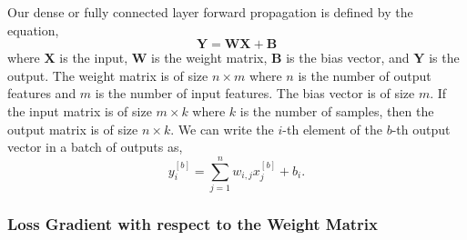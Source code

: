 \documentclass[twocolumn,pra,floatfix]{revtex4-2}
\begin{document}
                Our dense or fully connected layer forward propagation is defined by the equation,
                \begin{equation}
                    \mathbf{Y} = \mathbf{W} \mathbf{X} + \mathbf{B}\label{eq:5}
                \end{equation}
                where $\mathbf{X}$ is the input, $\mathbf{W}$ is the weight matrix, $\mathbf{B}$ is the bias vector, and $\mathbf{Y}$ is the output. The weight matrix is of size $n \times m$ where $n$ is the number of output features and $m$ is the number of input features. The bias vector is of size $m$. If the input matrix is of size $m \times k$ where $k$ is the number of samples, then the output matrix is of size $n \times k$. We can write the $i$-th element of the $b$-th output vector in a batch of outputs as,
                \begin{equation}
                    y_i^{[b]} = \sum_{j=1}^{n} w_{i,j} x_j^{[b]} + b_i.
                    \label{eq:paticular_output}
                \end{equation}    
                
            \subsubsection{Loss Gradient with respect to the Weight Matrix}
            
\end{document}
